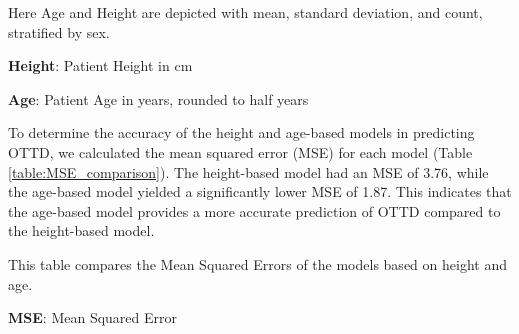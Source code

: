\documentclass[11pt]{article}
\begin{document}
\begin{table}[h]
\caption{Descriptive statistics of height and age, stratified by sex}
\label{table:descriptive_sex}
\begin{threeparttable}
\renewcommand{\TPTminimum}{\linewidth}
\begin{tablenotes}
\footnotesize
\item Here Age and Height are depicted with mean, standard deviation, and count, stratified by sex.
\item \textbf{Height}: Patient Height in cm
\item \textbf{Age}: Patient Age in years, rounded to half years
\end{tablenotes}
\end{threeparttable}
\end{table}


To determine the accuracy of the height and age-based models in predicting OTTD, we calculated the mean squared error (MSE) for each model (Table {}\ref{table:MSE_comparison}). The height-based model had an MSE of 3.76, while the age-based model yielded a significantly lower MSE of 1.87. This indicates that the age-based model provides a more accurate prediction of OTTD compared to the height-based model.

\begin{table}[h]
\caption{Comparison of Mean Squared Errors from Height and Age-Based Models}
\label{table:MSE_comparison}
\begin{threeparttable}
\renewcommand{\TPTminimum}{\linewidth}
\begin{tablenotes}
\footnotesize
\item This table compares the Mean Squared Errors of the models based on height and age.
\item \textbf{MSE}: Mean Squared Error
\end{tablenotes}
\end{threeparttable}
\end{table}
\end{document}
